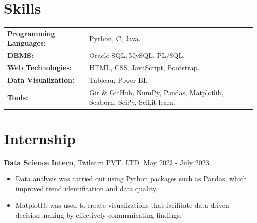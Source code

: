 \documentclass{article}
\begin{document}
\section*{Skills}
\vspace{-4mm} %
\begin{tabularx}{\textwidth}{@{}lX@{}}
\textbf{Programming Languages:} & Python, C, Java. \\[0.1mm]
\textbf{DBMS:} & Oracle SQL, MySQL, PL/SQL. \\[0.1mm]
\textbf{Web Technologies:} & HTML, CSS, JavaScript, Bootstrap. \\[0.1mm]
\textbf{Data Visualization:} &  Tableau, Power BI. \\[0.1mm]
\textbf{Tools:} & Git \& GitHub, NumPy, Pandas, Matplotlib, Seaborn, SciPy, Scikit-learn. \\
 \end{tabularx}
\vspace{-8mm}
\section*{Internship}
\vspace{-3mm} %
\textbf{Data Science Intern}, Twilearn PVT. LTD. \hfill May 2023 - July 2023 \\
\vspace{-6mm} %
\begin{itemize}[leftmargin=*,itemsep = 0.4mm]
    \item Data analysis was carried out using Python packages such as Pandas, which improved trend identification and data quality.
    \item Matplotlib was used to create visualizations that facilitate data-driven decision-making by effectively communicating findings.
\end{itemize}
\vspace{-7mm}
\end{document}
